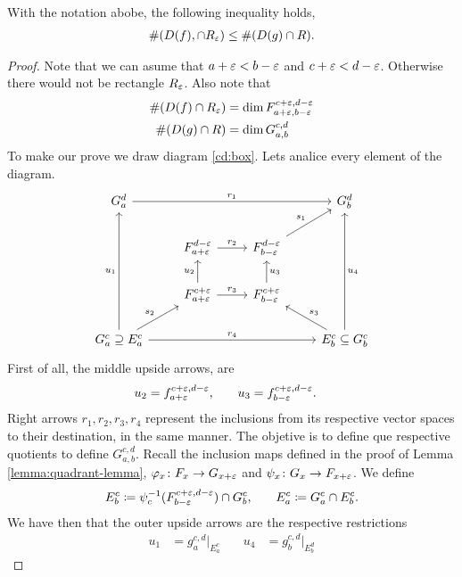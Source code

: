 \begin{lemma} \label{lemma:box-lemma}
    With the notation abobe, the following inequality holds,
    \begin{align}
        \#(D(f), \cap R_\varepsilon) \leq \#(D(g) \cap R).
    \end{align}
\end{lemma}
\begin{proof}
Note that we can asume that $ a + \varepsilon < b - \varepsilon $ and $ c+\varepsilon < d - \varepsilon $. Otherwise there would not be rectangle $ R_\varepsilon $. Also note that
\begin{align}
    \#(D(f) \cap R_\varepsilon) &= \dim F_{a+\varepsilon, b-\varepsilon}^{c+\varepsilon, d-\varepsilon} \\
    \#(D(g) \cap R) &= \dim G_{a, b}^{c, d} \\
\end{align}
To make our prove we draw diagram \ref{cd:box}. Lets analice every element of the diagram.
\begin{equation} \label{cd:box}
\begin{tikzcd}
    G_a^d \arrow[rrr, "r_1"]
    & & & G_b^d \\
    & F_{a+\e}^{d-\e} \arrow[r, "r_2"]
    & F_{b-\e}^{d-\e} \arrow[ru, "s_1"] & \\
    & F_{a+\e}^{c+\e} \arrow[u, "u_2"] \arrow[r, "r_3"]
    & F_{b-\e}^{c+\e} \arrow[u, "u_3"'] & \\
    G_a^c \supseteq E_a^c \arrow[ru, "s_2"] \arrow[uuu, "u_1"] \arrow[rrr, "r_4"]
    & & & E_b^c \subseteq G_b^c \arrow[lu, "s_3"'] \arrow[uuu, "u_4"']
\end{tikzcd}
\end{equation}
First of all, the middle upside arrows, are
\begin{align}
    u_2 &= f_{a+\varepsilon}^{c+\varepsilon, d-\varepsilon}, \quad & u_3 &= f_{b-\varepsilon}^{c+\varepsilon, d-\varepsilon}.
\end{align}
Right arrows $ r_1, r_2, r_3, r_4 $ represent the inclusions from its respective vector spaces to their destination, in the same manner. The objetive is to define que respective quotients to define $ G_{a, b}^{c, d} $. Recall the inclusion maps defined in the proof of Lemma \ref{lemma:quadrant-lemma}, $ \varphi_x \colon F_x \to G_{x+\varepsilon} $ and $ \psi_x \colon G_x \to F_{x+\varepsilon}$. We define
\begin{align}
    E_b^c &\coloneq \psi_c^{-1}(F_{b-\varepsilon}^{c+\varepsilon, d-\varepsilon}) \cap G_b^c, \quad & E_a^c \coloneq G_a^c \cap E_b^c.
\end{align}
We have then that the outer upside arrows are the respective restrictions
\begin{align}
    u_1 &= g_a^{c,d}\rvert_{E_a^c} \quad & u_4 &= g_b^{c,d}\rvert_{E_b^d}
\end{align}
\end{proof}

